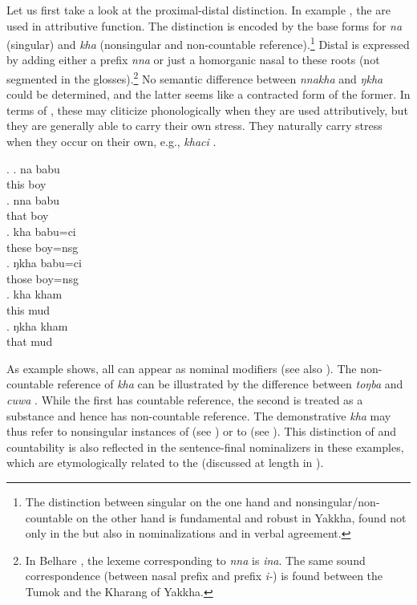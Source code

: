 \largerpage
Let us first take a look at the proximal-distal distinction.  In example \Next, the  are used in attributive function. The  distinction is encoded by the base forms for  \emph{na} (singular) and \emph{kha} (nonsingular and non-countable reference).\footnote{The distinction between singular on the one hand and nonsingular/non-countable on the other hand is fundamental and robust in Yakkha, found not only in the   but also in nominalizations and in verbal agreement.}  Distal  is expressed by adding either a prefix \emph{nna} or just a homorganic nasal to these roots (not segmented in the glosses).\footnote{In Belhare \citep[548]{Bickel2003Belhare}, the lexeme corresponding to \emph{nna} is \emph{ina}. The same sound correspondence (between nasal prefix and prefix \emph{i-}) is found between the Tumok and  the Kharang  of Yakkha.} No semantic difference between \emph{nnakha} and \emph{ŋkha} could be determined, and the latter seems like a contracted form of the former. In terms of , these  may cliticize phonologically when they are used attributively, but they are generally able to carry their own stress. They naturally  carry stress when they occur on their own, e.g., \emph{khaci} .

\ex. \ag. na babu \\
	this boy\\
	\bg. nna babu \\
		that boy\\
	\bg. kha babu=ci\\
		these boy{\sc =nsg}\\
	\bg. ŋkha babu=ci\\
		those boy{\sc =nsg}\\
		\bg. kha kham\\
		this mud\\
	\bg. ŋkha kham\\
		that mud\\

As example \Last shows, all  can appear as nominal modifiers (see also \Next). The non-countable reference of \emph{kha} can be illustrated by the difference between \emph{toŋba}  and \emph{cuwa} . While the first has countable reference, the second is treated as a substance and hence has non-countable reference. The demonstrative \emph{kha} may thus refer to nonsingular instances of  (see \Next[b]) or to   (see \Next[c]). This distinction of  and countability is also reflected in the sentence-final nominalizers in these examples, which are etymologically related to the  (discussed at length in ).

